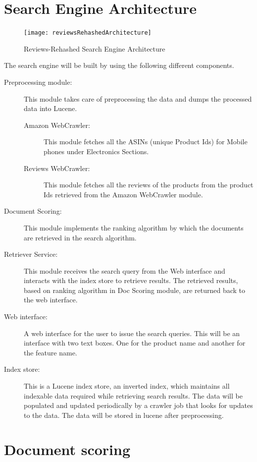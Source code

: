 \documentclass{article}
\begin{document}
\section{Search Engine Architecture}
\begin{figure}[ht!]
  \centering
  \texttt{[image: reviewsRehashedArchitecture]}
  \caption{Reviews-Rehashed Search Engine Architecture\label{fig:Search_Engine}}
\end{figure}
The search engine will be built by using the following different components.
\begin{description}
  \item[Preprocessing module:]  This module takes care of preprocessing the data and dumps the processed data into Lucene.
  \begin{description}
	 \item[Amazon WebCrawler:] This module fetches all the ASINs (unique Product Ids) for Mobile phones under Electronics Sections.
	 \item[Reviews WebCrawler:] This module fetches all the reviews of the products from the product Ids retrieved from the Amazon WebCrawler module.
  \end{description}
  \item[Document Scoring: ] This module implements the ranking algorithm by which the documents are retrieved in the search algorithm.
  \item[Retriever Service: ] This module receives the search query from the Web interface and interacts with the index store to retrieve results. The retrieved results, based on ranking algorithm in Doc Scoring module, are returned back to the web interface.
  \item[Web interface:] A web interface for the user to issue the search queries.  This will be an interface with two text boxes. One for the product name and another for the feature name.
  \item[Index store:]  This is a Lucene index store, an inverted index, which maintains all indexable data required while retrieving search results.  The data will be populated and updated periodically by a crawler job that looks for updates to the data.  The data will be stored in lucene after preprocessing.
\end{description}

\section{Document scoring}
\end{document}
